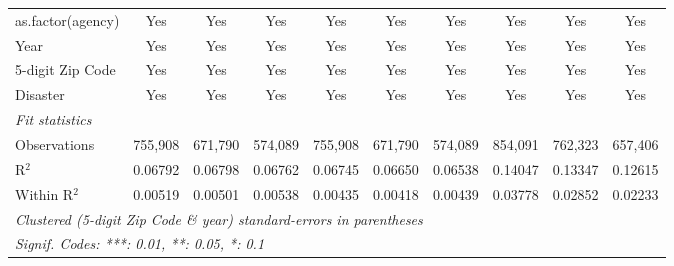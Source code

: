 \begin{tabular}{lccccccccc}
   as.factor(agency)                                          & Yes            & Yes            & Yes           & Yes           & Yes            & Yes          & Yes           & Yes           & Yes\\  
   Year                                                       & Yes            & Yes            & Yes           & Yes           & Yes            & Yes          & Yes           & Yes           & Yes\\  
   5-digit Zip Code                                           & Yes            & Yes            & Yes           & Yes           & Yes            & Yes          & Yes           & Yes           & Yes\\  
   Disaster                                                   & Yes            & Yes            & Yes           & Yes           & Yes            & Yes          & Yes           & Yes           & Yes\\  
   \midrule
   \emph{Fit statistics}\\
   Observations                                               & 755,908        & 671,790        & 574,089       & 755,908       & 671,790        & 574,089      & 854,091       & 762,323       & 657,406\\  
   R$^2$                                                      & 0.06792        & 0.06798        & 0.06762       & 0.06745       & 0.06650        & 0.06538      & 0.14047       & 0.13347       & 0.12615\\  
   Within R$^2$                                               & 0.00519        & 0.00501        & 0.00538       & 0.00435       & 0.00418        & 0.00439      & 0.03778       & 0.02852       & 0.02233\\  
   \midrule \midrule
   \multicolumn{10}{l}{\emph{Clustered (5-digit Zip Code \& year) standard-errors in parentheses}}\\
   \multicolumn{10}{l}{\emph{Signif. Codes: ***: 0.01, **: 0.05, *: 0.1}}\\
\end{tabular}
\par\endgroup
